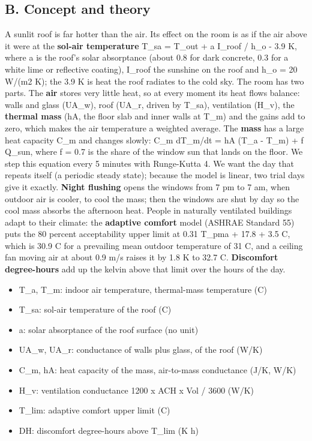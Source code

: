 \documentclass[11pt,a4paper]{article}
\begin{document}
\subsection*{B. Concept and theory}
A sunlit roof is far hotter than the air. Its effect on the room is as if the air above it were at the \textbf{sol-air temperature} T\_sa = T\_out + a I\_roof / h\_o - 3.9 K, where a is the roof's solar absorptance (about 0.8 for dark concrete, 0.3 for a white lime or reflective coating), I\_roof the sunshine on the roof and h\_o = 20 W/(m2 K); the 3.9 K is heat the roof radiates to the cold sky. The room has two parts. The \textbf{air} stores very little heat, so at every moment its heat flows balance: walls and glass (UA\_w), roof (UA\_r, driven by T\_sa), ventilation (H\_v), the \textbf{thermal mass} (hA, the floor slab and inner walls at T\_m) and the gains add to zero, which makes the air temperature a weighted average. The \textbf{mass} has a large heat capacity C\_m and changes slowly: C\_m dT\_m/dt = hA (T\_a - T\_m) + f Q\_sun, where f = 0.7 is the share of the window sun that lands on the floor. We step this equation every 5 minutes with Runge-Kutta 4. We want the day that repeats itself (a periodic steady state); because the model is linear, two trial days give it exactly. \textbf{Night flushing} opens the windows from 7 pm to 7 am, when outdoor air is cooler, to cool the mass; then the windows are shut by day so the cool mass absorbs the afternoon heat. People in naturally ventilated buildings adapt to their climate: the \textbf{adaptive comfort} model (ASHRAE Standard 55) puts the 80 percent acceptability upper limit at 0.31 T\_pma + 17.8 + 3.5 C, which is 30.9 C for a prevailing mean outdoor temperature of 31 C, and a ceiling fan moving air at about 0.9 m/s raises it by 1.8 K to 32.7 C. \textbf{Discomfort degree-hours} add up the kelvin above that limit over the hours of the day.

\begin{itemize}[nosep]
\item T\_a, T\_m: indoor air temperature, thermal-mass temperature (C)
\item T\_sa: sol-air temperature of the roof (C)
\item a: solar absorptance of the roof surface (no unit)
\item UA\_w, UA\_r: conductance of walls plus glass, of the roof (W/K)
\item C\_m, hA: heat capacity of the mass, air-to-mass conductance (J/K, W/K)
\item H\_v: ventilation conductance 1200 x ACH x Vol / 3600 (W/K)
\item T\_lim: adaptive comfort upper limit (C)
\item DH: discomfort degree-hours above T\_lim (K h)
\end{itemize}
\end{document}
